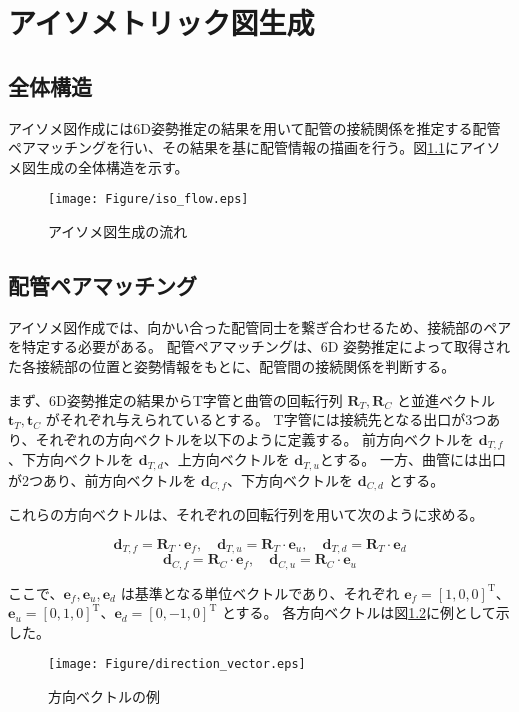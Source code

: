 \chapter{アイソメトリック図生成}
\section{全体構造}
アイソメ図作成には6D姿勢推定の結果を用いて配管の接続関係を推定する配管ペアマッチングを行い、その結果を基に配管情報の描画を行う。図\ref{fig:f1}にアイソメ図生成の全体構造を示す。
\begin{figure}[htbt]
  \centering
   \texttt{[image: Figure/iso\_flow.eps]}
   \caption{アイソメ図生成の流れ}
   \label{fig:f1}
\end{figure}

\section{配管ペアマッチング}
アイソメ図作成では、向かい合った配管同士を繋ぎ合わせるため、接続部のペアを特定する必要がある。
配管ペアマッチングは、6D 姿勢推定によって取得された各接続部の位置と姿勢情報をもとに、配管間の接続関係を判断する。

まず、6D姿勢推定の結果からT字管と曲管の回転行列 $\mathbf{R}_T, \mathbf{R}_C$ と並進ベクトル $\mathbf{t}_T, \mathbf{t}_C$ がそれぞれ与えられているとする。
T字管には接続先となる出口が3つあり、それぞれの方向ベクトルを以下のように定義する。
前方向ベクトルを $\mathbf{d}_{T,f}$、下方向ベクトルを $\mathbf{d}_{T,d}$、上方向ベクトルを $\mathbf{d}_{T,u}$とする。
一方、曲管には出口が2つあり、前方向ベクトルを $\mathbf{d}_{C,f}$、下方向ベクトルを $\mathbf{d}_{C,d}$ とする。

これらの方向ベクトルは、それぞれの回転行列を用いて次のように求める。

\[
\mathbf{d}_{T,f} = \mathbf{R}_T \cdot \mathbf{e}_f, \quad 
\mathbf{d}_{T,u} = \mathbf{R}_T \cdot \mathbf{e}_u, \quad 
\mathbf{d}_{T,d} = \mathbf{R}_T \cdot \mathbf{e}_d
\]
\[
\mathbf{d}_{C,f} = \mathbf{R}_C \cdot \mathbf{e}_f, \quad 
\mathbf{d}_{C,u} = \mathbf{R}_C \cdot \mathbf{e}_u
\]

ここで、$\mathbf{e}_f, \mathbf{e}_u, \mathbf{e}_d$ は基準となる単位ベクトルであり、それぞれ $\mathbf{e}_f = [1, 0, 0]^\mathrm{T}$、$\mathbf{e}_u = [0, 1, 0]^\mathrm{T}$、$\mathbf{e}_d = [0, -1, 0]^\mathrm{T}$ とする。
各方向ベクトルは図\ref{fig:f2}に例として示した。
\begin{figure}[htbt]
  \centering
   \texttt{[image: Figure/direction\_vector.eps]}
   \caption{方向ベクトルの例}
   \label{fig:f2}
\end{figure}

